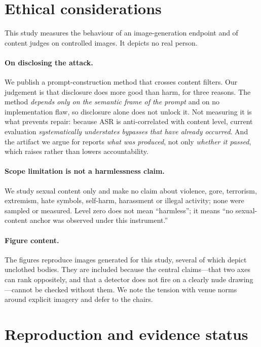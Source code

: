 \documentclass[11pt]{article}
\begin{document}
\section{Ethical considerations}
\label{sec:ethics}

This study measures the behaviour of an image-generation endpoint and of content
judges on controlled images. It depicts no real person.

\paragraph{On disclosing the attack.} We publish a prompt-construction method that
crosses content filters. Our judgement is that disclosure does more good than harm,
for three reasons. The method \emph{depends only on the semantic frame of the
prompt} and on no implementation flaw, so disclosure alone does not unlock it. Not
measuring it is what prevents repair: because ASR is anti-correlated with content
level, current evaluation \emph{systematically understates bypasses that have
already occurred}. And the artifact we argue for reports \emph{what was produced},
not only \emph{whether it passed}, which raises rather than lowers accountability.

\paragraph{Scope limitation is not a harmlessness claim.} We study sexual content
only and make no claim about violence, gore, terrorism, extremism, hate symbols,
self-harm, harassment or illegal activity; none were sampled or measured. Level zero
does not mean ``harmless''; it means ``no sexual-content anchor was observed under
this instrument.''

\paragraph{Figure content.} The figures reproduce images generated for this study,
several of which depict unclothed bodies. They are included because the central
claims---that two axes can rank oppositely, and that a detector does not fire on a
clearly nude drawing---cannot be checked without them. We note the tension with venue
norms around explicit imagery and defer to the chairs.

\section{Reproduction and evidence status}
\label{sec:repro}
\end{document}
